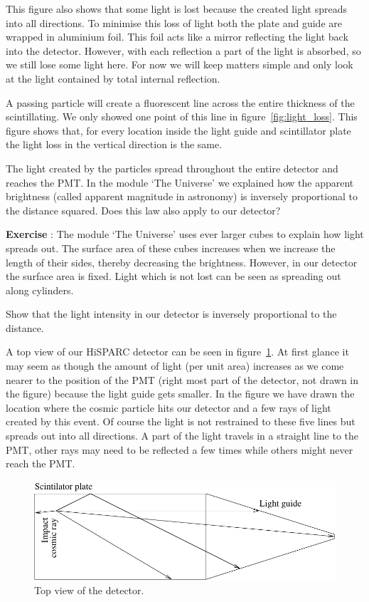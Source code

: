 \documentclass[12pt,a4paper]{article}
\numberwithin{equation}{section}
\numberwithin{figure}{section}
\newcounter{Exercise}
\numberwithin{table}{section}
\begin{document}
This figure also shows that some light is lost because the created light spreads into all directions. To minimise this loss of light both the plate and guide are wrapped in aluminium foil. This foil acts like a mirror reflecting the light back into the detector. However, with each reflection a part of the light is absorbed, so we still lose some light here. For now we will keep matters simple and only look at the light contained by total internal reflection.

A passing particle will create a fluorescent line across the entire thickness of the scintillating. We only showed one point of this line in figure~\ref{fig:light_loss}. This figure shows that, for every location inside the light guide and scintillator plate the light loss in the vertical direction is the same.

The light created by the particles spread throughout the entire detector and reaches the PMT. In the module `The Universe' we explained how the apparent brightness (called apparent magnitude in astronomy) is inversely proportional to the distance squared. Does this law also apply to our detector?

\begin{shaded}
\textbf{Exercise \theExercise {}} : The module `The Universe' uses ever larger cubes to explain how light spreads out. The surface area of these cubes increases when we increase the length of their sides, thereby decreasing the brightness. However, in our detector the surface area is fixed. Light which is not lost can be seen as spreading out along cylinders. 

Show that the light intensity in our detector is inversely proportional to the distance. \end{shaded}

A top view of our HiSPARC detector can be seen in figure~\ref{fig:top_view}. At first glance it may seem as though the amount of light (per unit area) increases as we come nearer to the position of the PMT (right most part of the detector, not drawn in the figure) because the light guide gets smaller. In the figure we have drawn the location where the cosmic particle hits our detector and a few rays of light created by this event. Of course the light is not restrained to these five lines but spreads out into all directions. A part of the light travels in a straight line to the PMT, other rays may need to be reflected a few times while others might never reach the PMT.

\begin{figure}\begin{center}
\includegraphics[scale=1]{top_view.pdf}
\caption{Top view of the detector.}\label{fig:top_view}
\end{center}\end{figure}
\end{document}

